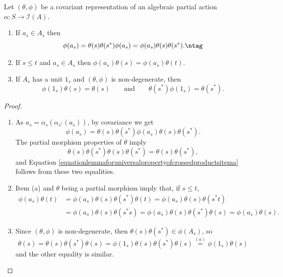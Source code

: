 \begin{lemma}\label{lemmaforuniversalpropertyofcrossedproducts}
Let $(\theta,\phi)$ be a covariant representation of an algebraic partial action $\alpha:S\to\mathcal{I}(A)$.
\begin{enumerate}
\item[(a)] If $a_s\in A_s$ then
\[\phi(a_s)=\theta(s)\theta(s^*)\phi(a_s)=\phi(a_s)\theta(s)\theta(s^*).\ntag\label{equationlemmaforuniversalpropertyofcrossedproductsitema}\]
\item[(b)] If $s\leq t$ and $a_s\in A_s$ then $\phi(a_s)\theta(s)=\phi(a_s)\theta(t)$.
\item[(c)] If $A_s$ has a unit $1_s$ and $(\theta,\phi)$ is non-degenerate, then
\[\phi(1_s)\theta(s)=\theta(s)\qquad\text{and}\qquad\theta(s^*)\phi(1_s)=\theta(s^*).\]
\end{enumerate}
\end{lemma}
\begin{proof}
\begin{enumerate}
\item[(a)] As $a_s=\alpha_s(\alpha_{s^*}(a_s))$, by covariance we get
\[\phi(a_s)=\theta(s)\theta(s^*)\phi(a_s)\theta(s)\theta(s^*).\]
The partial morphism properties of $\theta$ imply
\[\theta(s)\theta(s^*)\theta(s)\theta(s^*)=\theta(s)\theta(s^*),\]
and Equation \ref{equationlemmaforuniversalpropertyofcrossedproductsitema} follows from these two equalities.
\item[(b)] Item (a) and $\theta$ being a partial morphism imply that, if $s\leq t$,
\begin{align*}
\phi(a_s)\theta(t)&=\phi(a_s)\theta(s)\theta(s^*)\theta(t)=\phi(a_s)\theta(s)\theta(s^*t)\\
&=\phi(a_s)\theta(s)\theta(s^*s)=\phi(a_s)\theta(s)\theta(s^*)\theta(s)=\phi(a_s)\theta(s).
\end{align*}
\item[(c)] Since $(\theta,\phi)$ is non-degenerate, then $\theta(s)\theta(s^*)\in\phi(A_s)$, so
\[\theta(s)=\theta(s)\theta(s^*)\theta(s)=\phi(1_s)\theta(s)\theta(s^*)\theta(s)\overset{(a)}{=} \phi(1_s)\theta(s)\]
and the other equality is similar.\qedhere
\end{enumerate}
\end{proof}

